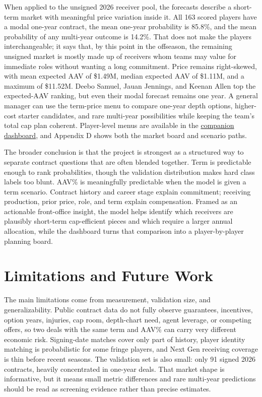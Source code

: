 \documentclass[
  10pt,
]{article}
\begin{document}
When applied to the unsigned 2026 receiver pool, the forecasts describe a short-term market with meaningful price variation inside it. All 163 scored players have a modal one-year contract, the mean one-year probability is 85.8\%, and the mean probability of any multi-year outcome is 14.2\%. That does not make the players interchangeable; it says that, by this point in the offseason, the remaining unsigned market is mostly made up of receivers whom teams may value for immediate roles without wanting a long commitment. Price remains right-skewed, with mean expected AAV of \$1.49M, median expected AAV of \$1.11M, and a maximum of \$11.52M. Deebo Samuel, Jauan Jennings, and Keenan Allen top the expected-AAV ranking, but even their modal forecast remains one year. A general manager can use the term-price menu to compare one-year depth options, higher-cost starter candidates, and rare multi-year possibilities while keeping the team's total cap plan coherent. Player-level menus are available in the \href{https://rentosaijo.github.io/NFLxC/}{companion dashboard}, and Appendix D shows both the market board and scenario paths.

The broader conclusion is that the project is strongest as a structured way to separate contract questions that are often blended together. Term is predictable enough to rank probabilities, though the validation distribution makes hard class labels too blunt. AAV\% is meaningfully predictable when the model is given a term scenario. Contract history and career stage explain commitment; receiving production, prior price, role, and term explain compensation. Framed as an actionable front-office insight, the model helps identify which receivers are plausibly short-term cap-efficient pieces and which require a larger annual allocation, while the dashboard turns that comparison into a player-by-player planning board.

\section{Limitations and Future Work}\label{limitations-and-future-work}

The main limitations come from measurement, validation size, and generalizability. Public contract data do not fully observe guarantees, incentives, option years, injuries, cap room, depth-chart need, agent leverage, or competing offers, so two deals with the same term and AAV\% can carry very different economic risk. Signing-date matches cover only part of history, player identity matching is probabilistic for some fringe players, and Next Gen receiving coverage is thin before recent seasons. The validation set is also small: only 91 signed 2026 contracts, heavily concentrated in one-year deals. That market shape is informative, but it means small metric differences and rare multi-year predictions should be read as screening evidence rather than precise estimates.
\end{document}

